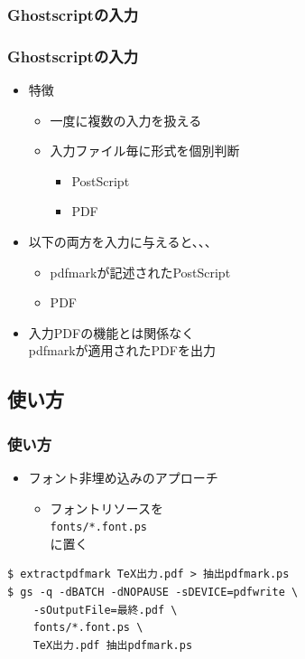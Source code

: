 \documentclass[unicode,17pt]{beamer}
\begin{document}
\subsubsection{Ghostscriptの入力}
\begin{frame}\frametitle{Ghostscriptの入力}
  \begin{itemize}
  \item 特徴
    \begin{itemize}
    \item 一度に複数の入力を扱える
    \item 入力ファイル毎に形式を個別判断
      \begin{itemize}
      \item PostScript
      \item PDF
      \end{itemize}
    \end{itemize}
  \item 以下の両方を入力に与えると、、、
    \begin{itemize}
    \item pdfmarkが記述されたPostScript
    \item PDF
    \end{itemize}
  \item 入力PDFの機能とは関係なく\\
    pdfmarkが適用されたPDFを出力
  \end{itemize}
\end{frame}

\subsection{使い方}
\begin{frame}[fragile]\frametitle{使い方}
  \begin{itemize}
  \item フォント非埋め込みのアプローチ
    \begin{itemize}
    \item フォントリソースを\\
      \verb|fonts/*.font.ps|\\
      に置く
    \end{itemize}
  \end{itemize}
  \centering
  \begin{tcolorbox}[width=0.7\linewidth,left=0mm,right=0mm,top=0mm,bottom=0mm]
    \begin{lstlisting}
$ extractpdfmark TeX出力.pdf > 抽出pdfmark.ps
$ gs -q -dBATCH -dNOPAUSE -sDEVICE=pdfwrite \
    -sOutputFile=最終.pdf \
    fonts/*.font.ps \
    TeX出力.pdf 抽出pdfmark.ps
    \end{lstlisting}
  \end{tcolorbox}
\end{frame}
\end{document}
